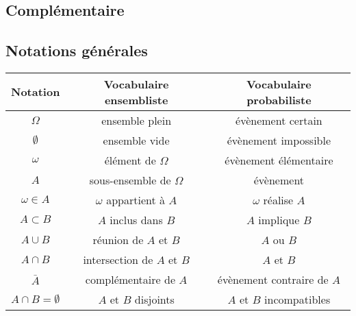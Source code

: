 \documentclass[10pt]{article}
\begin{document}
\exemple{}{
	\begin{itemize}
		\item $ ]-\infty;3]\cap]2;+\infty[ \text{ $=$ } ]2;3]$
		\item $ [1;3] \cup ]2;+\infty[ \text{ $=$ } [1;+\infty[ $
	\end{itemize}
}

\subsection{Complémentaire}



\subsection{Notations générales}

\begin{tabular}{|c|c|c|}
	\hline
	Notation               & Vocabulaire ensembliste    & Vocabulaire probabiliste   \\
	\hline
	$\Omega$               & ensemble plein             & évènement certain          \\
	\hline
	$\emptyset$            & ensemble vide              & évènement impossible       \\
	\hline
	$\omega$               & élément de $\Omega$        & évènement élémentaire      \\
	\hline
	$A$                    & sous-ensemble de $\Omega$  & évènement                  \\
	\hline
	$\omega \in A$         & $\omega$ appartient à $A$  & $\omega$ réalise $A$       \\
	\hline
	$A \subset B$          & $A$ inclus dans $B$        & $A$ implique $B$           \\
	\hline
	$A \cup B$             & réunion de $A$ et $B$      & $A$ ou $B$                 \\
	\hline
	$A \cap B$             & intersection de $A$ et $B$ & $A$ et $B$                 \\
	\hline
	$\bar{A}$              & complémentaire de $A$      & évènement contraire de $A$ \\
	\hline
	$A \cap B = \emptyset$ & $A$ et $B$ disjoints       & $A$ et $B$ incompatibles   \\
	\hline
\end{tabular}
\end{document}
